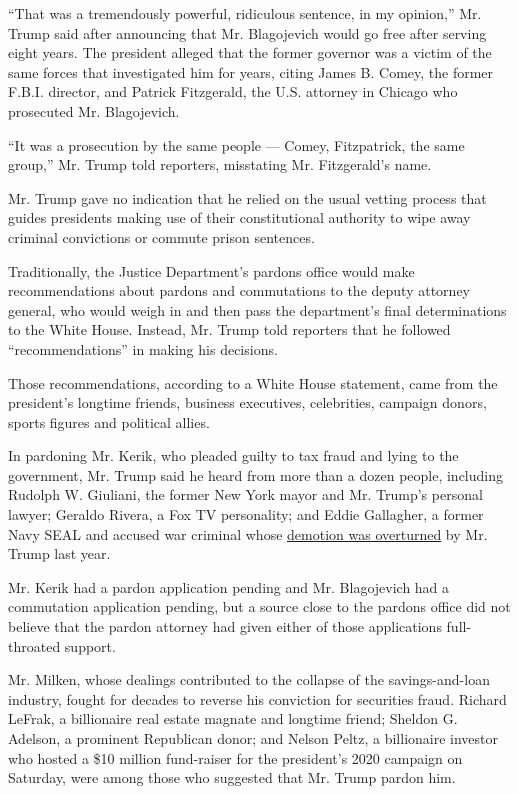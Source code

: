 ``That was a tremendously powerful, ridiculous sentence, in my
opinion,'' Mr. Trump said after announcing that Mr. Blagojevich would go
free after serving eight years. The president alleged that the former
governor was a victim of the same forces that investigated him for
years, citing James B. Comey, the former F.B.I. director, and Patrick
Fitzgerald, the U.S. attorney in Chicago who prosecuted Mr. Blagojevich.

``It was a prosecution by the same people --- Comey, Fitzpatrick, the
same group,'' Mr. Trump told reporters, misstating Mr. Fitzgerald's
name.

Mr. Trump gave no indication that he relied on the usual vetting process
that guides presidents making use of their constitutional authority to
wipe away criminal convictions or commute prison sentences.

Traditionally, the Justice Department's pardons office would make
recommendations about pardons and commutations to the deputy attorney
general, who would weigh in and then pass the department's final
determinations to the White House. Instead, Mr. Trump told reporters
that he followed ``recommendations'' in making his decisions.

Those recommendations, according to a White House statement, came from
the president's longtime friends, business executives, celebrities,
campaign donors, sports figures and political allies.

In pardoning Mr. Kerik, who pleaded guilty to tax fraud and lying to the
government, Mr. Trump said he heard from more than a dozen people,
including Rudolph W. Giuliani, the former New York mayor and Mr. Trump's
personal lawyer; Geraldo Rivera, a Fox TV personality; and Eddie
Gallagher, a former Navy SEAL and accused war criminal whose
\href{https://www.nytimes.com/2019/11/21/us/trump-seals-eddie-gallagher.html}{demotion
was overturned} by Mr. Trump last year.

Mr. Kerik had a pardon application pending and Mr. Blagojevich had a
commutation application pending, but a source close to the pardons
office did not believe that the pardon attorney had given either of
those applications full-throated support.

Mr. Milken, whose dealings contributed to the collapse of the
savings-and-loan industry, fought for decades to reverse his conviction
for securities fraud. Richard LeFrak, a billionaire real estate magnate
and longtime friend; Sheldon G. Adelson, a prominent Republican donor;
and Nelson Peltz, a billionaire investor who hosted a \$10 million
fund-raiser for the president's 2020 campaign on Saturday, were among
those who suggested that Mr. Trump pardon him.

